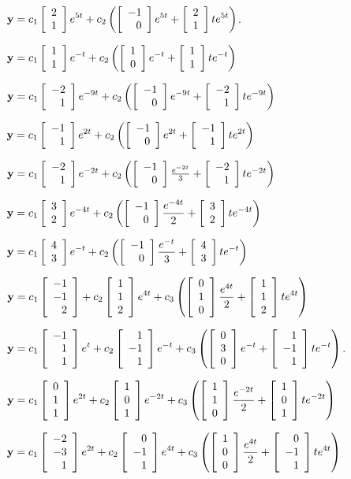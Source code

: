 \medskip

  ${\bf y}=\dst{c_{1}\twocol21e^{5t}
+c_{2}\left(\twocol{-1}{\phantom{-}0}e^{5t}+\twocol21te^{5t}\right)}$.

\smallskip
{}
${\bf y}=\dst{
c_{1}\twocol11e^{-t}+c_{2}\left(\twocol10e^{-t}+\twocol11te^{-t}\right)}$

\smallskip
{}
${\bf y}=\dst{
c_{1}\twocol{-2}{\phantom{-}1}e^{-9t}+c_{2}\left(\twocol{-1}{\phantom{-}0}e^{-9t}
+\twocol{-2}{\phantom{-}1}te^{-9t}\right)}$

\smallskip
{}
 ${\bf y}=\dst{
c_{1}\twocol{-1}{\phantom{-}1}e^{2t}+c_{2}\left(\twocol{-1}{\phantom{-}0}
e^{2t}+\twocol{-1}{\phantom{-}1}te^{2t}\right)}$

\smallskip

${\bf y}=c_{1}
\left[\begin{array}{r}
-2\\1
\end{array}\right]e^{-2t} +c_{2}\left(
\left[\begin{array}{r}
-1\\0
\end{array}\right]
\frac{e^{-2t}}{3}+
\left[\begin{array}{r}
-2\\1
\end{array}\right]
te^{-2t}\right)$

\smallskip
{}
${\bf y}=\dst{c_{1}\twocol32e^{-4t}+
c_{2}\left(\twocol{-1}{\phantom{-}0}{\frac{e^{-4t}}{2}}+\twocol32te^{-4t}\right)}$

\smallskip
{}
 ${\bf y}=\dst{c_{1}\twocol43e^{-t}+
c_{2}\left(\twocol{-1}{\phantom{-}0}{\frac{e^{-t}}{3}}+\twocol43te^{-t}\right)}$

\smallskip
{}
${\bf y}=\dst{c_{1}\threecol{-1}{-1}2+c_{2}\threecol112e^{4t}+
c_{3}\left(\threecol010{\frac{e^{4t}}{2}}+\threecol112te^{4t}\right)}$

\smallskip
{}
 ${\bf y}=\dst{c_1\threecol{-1}11e^t+c_2\threecol1{-1}1e^{-t}+c_3\left
(\threecol030e^{-t}+\threecol1{-1}1te^{-t}\right)}$.

\smallskip
{}
${\bf y}=\dst{c_1\threecol011e^{2t}+c_2\threecol101e^{-2t}+c_3\left
(\threecol110{\frac{e^{-2t}}{2}}+\threecol101te^{-2t}\right)}$

\smallskip
{}
 ${\bf y}=\dst{
c_1\threecol{-2}{-3}1e^{2t}+c_2\threecol0{-1}1e^{4t}+c_3\left
(\threecol100{\frac{e^{4t}}{2}}+\threecol0{-1}1te^{4t}\right)}$

